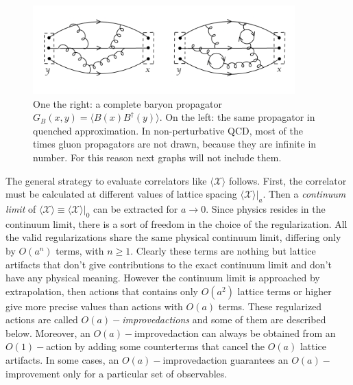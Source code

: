 \documentclass[english, LaM, oneside, noexaminfo]{sapthesis}
\newcommand{\la}{\langle}
\newcommand{\ra}{\rangle}
\newcommand{\oaid}{$O(a)-$improved}
\begin{document}
\begin{figure}[h!]
    \centering
    \includegraphics[width=0.9\textwidth]{imgs-MSc-thesis/quenched.png}
    \caption{One the right: a complete baryon propagator $G_B(x,y) = \la B(x) B^\dagger (y) \ra$.
        On the left: the same propagator in quenched approximation.
        In non-perturbative QCD, most of the times gluon propagators are not drawn, because they are infinite in number.
        For this reason next graphs will not include them.}
    \label{fig:quenched-approximation}
\end{figure}
\newline
The general strategy to evaluate correlators like $\la\mathcal{X}\ra$ follows.
First, the correlator must be calculated at different values of lattice spacing $\la\mathcal{X}\ra |_a$.
Then a {\it continuum limit} of $\la\mathcal{X}\ra \equiv \la\mathcal{X}\ra |_0$ can be extracted for $a \rightarrow 0$.
Since physics resides in the continuum limit, there is a sort of freedom in the choice of the regularization.
All the valid regularizations share the same physical continuum limit, differing only by $O(a^n)$ terms, with $n\ge 1$.
Clearly these terms are nothing but lattice artifacts that don't give contributions to the exact continuum limit and don't have any physical meaning.
However the continuum limit is approached by extrapolation, then actions that contains only $O(a^2)$ lattice terms or higher give more precise values than actions with $O(a)$ terms.
These regularized actions are called {\it \oaid \space actions} and some of them are described below.
Moreover, an \oaid \space action can always be obtained from an $O(1)-$action by adding some counterterms that cancel the $O(a)$ lattice artifacts.
In some cases, an \oaid\space action guarantees an $O(a)-$improvement only for a particular set of observables.
\end{document}
